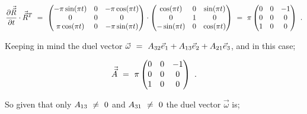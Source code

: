 \documentclass{article}
\begin{document}
\begin{equation} \label{eb-eq-1-64}
\frac{\partial{\vec{\vec{R}}}}{\partial{t}} \cdot \vec{\vec{R}}^{T} \hspace{0.125cm} = \hspace{0.125cm} \begin{pmatrix} - \pi \sin ( \pi t ) & 0 & - \pi \cos ( \pi t ) \\ 0 & 0 & 0 \\ \pi \cos ( \pi t ) & 0 & - \pi \sin ( \pi t ) \end{pmatrix} \cdot \begin{pmatrix} \cos ( \pi t ) & 0 & \sin ( \pi t ) \\ 0 & 1 & 0 \\ - \sin ( \pi t ) & 0 & \cos ( \pi t ) \end{pmatrix} \hspace{0.125cm} =  \hspace{0.125cm} \pi \begin{pmatrix} 0 & 0 & -1 \\ 0 & 0 & 0 \\ 1 & 0 & 0 \end{pmatrix}  \hspace{0.125cm} .
\end{equation} 

Keeping in mind the duel vector \begin{math} \vec{\omega} \hspace{0.125cm} =  \hspace{0.125cm} A_{32} \vec{e}_1 + A_{13} \vec{e}_2 + A_{21} \vec{e}_3 \end{math}, and in this case;

\begin{equation} \label{eb-eq-1-65}
\vec{\vec{A}}  \hspace{0.125cm} = \hspace{0.125cm} \pi \begin{pmatrix} 0 & 0 & -1 \\ 0 & 0 & 0 \\ 1 & 0 & 0 \end{pmatrix}  \hspace{0.125cm} .
\end{equation} 

\vspace{0.25cm}

So given that only \begin{math} A_{13} \hspace{0.125cm} \neq \hspace{0.125cm} 0 \end{math} and \begin{math} A_{31} \hspace{0.125cm} \neq \hspace{0.125cm} 0 \end{math} the duel vector \begin{math} \vec{\omega} \end{math} is;
\end{document}
